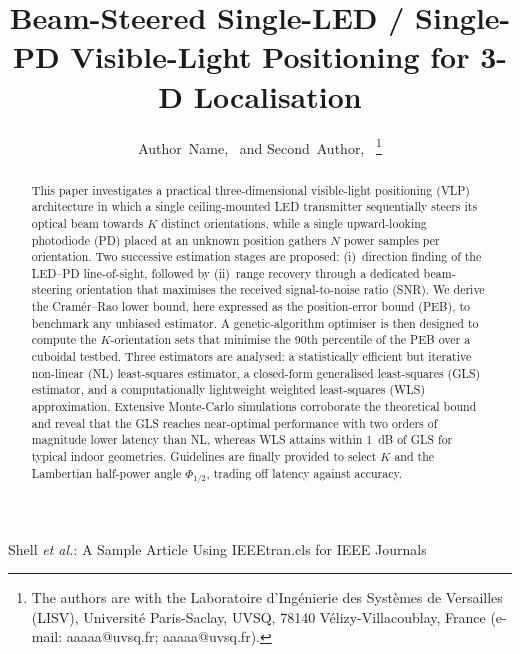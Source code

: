 \documentclass[lettersize,journal]{IEEEtran}
\begin{document}
\title{Beam-Steered Single-LED / Single-PD Visible-Light Positioning for 3-D Localisation}

\author{Author~Name,~ and Second~Author,~%
    \thanks{The authors are with the Laboratoire d’Ingénierie des Systèmes de Versailles (LISV), Université Paris-Saclay, UVSQ, 78140 Vélizy-Villacoublay, France (e-mail: aaaaa@uvsq.fr; aaaaa@uvsq.fr).}}

%
{Shell \MakeLowercase{\textit{et al.}}: A Sample Article Using IEEEtran.cls for IEEE Journals}

\maketitle

\begin{abstract}
This paper investigates a practical three-dimensional visible-light positioning (VLP) architecture in which a single ceiling-mounted LED transmitter sequentially steers its optical beam towards $K$ distinct orientations, while a single upward-looking photodiode (PD) placed at an unknown position gathers $N$ power samples per orientation. Two successive estimation stages are proposed: (i)~direction finding of the LED–PD line-of-sight, followed by (ii)~range recovery through a dedicated beam-steering orientation that maximises the received signal-to-noise ratio (SNR). We derive the Cramér–Rao lower bound, here expressed as the position-error bound (PEB), to benchmark any unbiased estimator. A genetic-algorithm optimiser is then designed to compute the $K$-orientation sets that minimise the 90th percentile of the PEB over a cuboidal testbed. Three estimators are analysed: a statistically efficient but iterative non-linear (NL) least-squares estimator, a closed-form generalised least-squares (GLS) estimator, and a computationally lightweight weighted least-squares (WLS) approximation. Extensive Monte-Carlo simulations corroborate the theoretical bound and reveal that the GLS reaches near-optimal performance with two orders of magnitude lower latency than NL, whereas WLS attains within 1~dB of GLS for typical indoor geometries. Guidelines are finally provided to select $K$ and the Lambertian half-power angle $\Phi_{1/2}$, trading off latency against accuracy.
\end{abstract}
\end{document}

